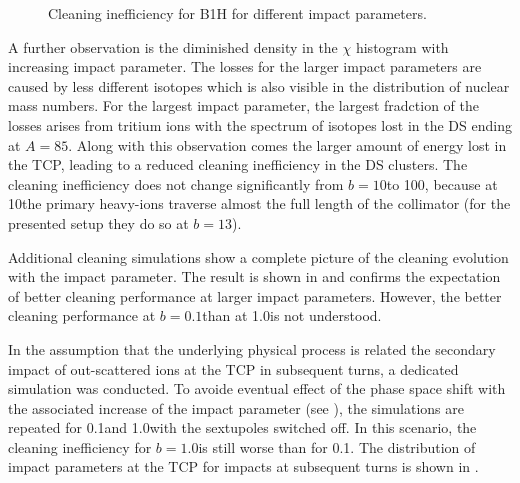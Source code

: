 \begin{figure}[t]
  \centering
  \caption{Cleaning inefficiency for B1H for different impact parameters.}  
  \label{pic:16062203}
  \end{figure}


A further observation is the diminished density in the $\chi$ histogram with increasing impact parameter. The losses for the larger impact parameters are caused by less different isotopes which is also visible in the distribution of nuclear mass numbers.  For the largest impact parameter, the largest fradction of the losses arises from tritium ions with the spectrum of isotopes lost in the DS ending at $A=85$. Along with this observation comes the larger amount of energy lost in the TCP, leading to a reduced cleaning inefficiency in the DS clusters. The cleaning inefficiency does not change significantly from $b=10$\mum to 100\mum, because at 10\mum the primary heavy-ions traverse almost the full length of the collimator (for the presented setup they do so at $b=13$\mum). 

Additional cleaning simulations show a complete picture of the cleaning evolution with the impact parameter. The result is shown in  and confirms the expectation of better cleaning performance at larger impact parameters. However, the better cleaning performance at $b=0.1$\mum than at 1.0\mum is not understood. 

In the assumption that the underlying physical process is related the secondary impact of out-scattered \lead ions at the TCP in subsequent turns, a dedicated simulation was conducted. To avoide eventual effect of the phase space shift with the associated increase of the impact parameter (see ), the simulations are repeated for 0.1\mum and 1.0\mum with the sextupoles switched off. In this scenario, the cleaning inefficiency for $b=1.0$\mum is still worse than for 0.1\mum. The distribution of impact parameters at the TCP for impacts at subsequent turns is shown in . 













